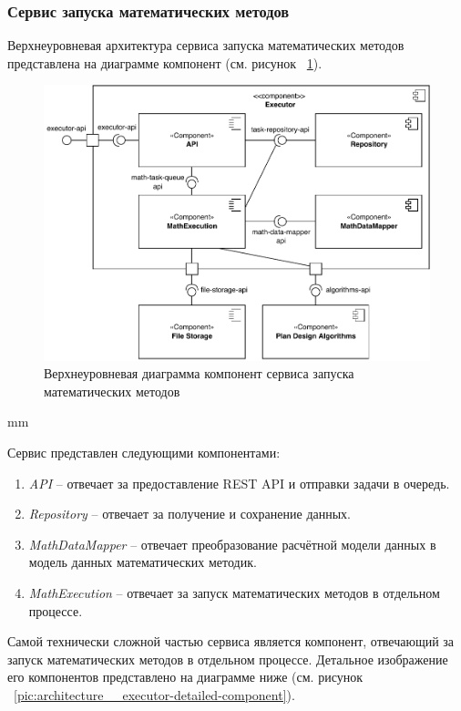 \subsubsection{\large{Сервис запуска математических методов}}

Верхнеуровневая архитектура сервиса запуска математических методов представлена на диаграмме компонент
(см. рисунок \ \ref{pic:architecture__executor-component}).

\begin{figure}[H]
	\includegraphics[width=\textwidth]{architecture/pictures/executor/component_common}
	\caption{Верхнеуровневая диаграмма компонент сервиса запуска математических методов}
	\label{pic:architecture__executor-component}
\end{figure}
 mm

Сервис представлен следующими компонентами:
\begin{enumerate}
	\item {
		\textit{API} -- отвечает за предоставление REST API и отправки задачи в очередь.
	}
	\item {
		\textit{Repository} -- отвечает за получение и сохранение данных.
	}
	\item {
		\textit{MathDataMapper} -- отвечает преобразование расчётной модели данных в модель данных математических методик.
	}
	\item {
		\textit{MathExecution} -- отвечает за запуск математических методов в отдельном процессе.
	}
\end{enumerate}

Самой технически сложной частью сервиса является компонент, отвечающий за запуск математических методов
в отдельном процессе. Детальное изображение его компонентов представлено
на диаграмме ниже (см. рисунок \ \ref{pic:architecture__executor-detailed-component}).

